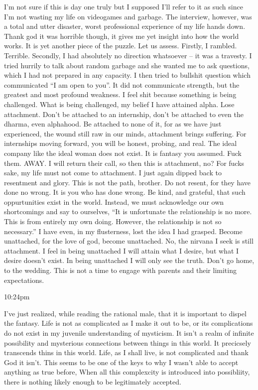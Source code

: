 I'm not sure if this is day one truly but I supposed I'll refer to it as
such since I'm not wasting my life on videogames and garbage. The
interview, however, was a total and utter disaster, worst professional
experience of my life hands down. Thank god it was horrible though, it
gives me yet insight into how the world works. It is yet another piece
of the puzzle. Let us assess. Firstly, I rambled. Terrible. Secondly, I
had absolutely no direction whatsoever -- it was a travesty. I tried
hurrily to talk about random garbage and she wanted me to ask questions,
which I had not prepared in any capacity. I then tried to bullshit
question which communicated ``I am open to you''. It did not communicate
strength, but the greatest and most profound weakness. I feel shit
because something is being challenged. What is being challenged, my
belief I have attained alpha. Lose attachment. Don't be attached to an
internship, don't be attached to even the dharma, even alphahood. Be
attached to none of it, for as we have just experienced, the wound still
raw in our minds, attachment brings suffering. For internships moving
forward, you will be honest, probing, and real. The ideal company like
the ideal woman does not exist. It is fantasy you assumed. Fuck them.
AWAY. I will return their call, so then this is attachment, no? For
fucks sake, my life must not come to attachment. I just again dipped
back to resentment and glory. This is not the path, brother. Do not
resent, for they have done no wrong. It is you who has done wrong. Be
kind, and grateful, that such oppurtunities exist in the world. Instead,
we must acknowledge our own shortcomings and say to ourselves, ``It is
unfortunate the relationship is no more. This is from entirely my own
doing. However, the relationship is not so necessary.'' I have even, in
my flusterness, lost the idea I had grasped. Become unattached, for the
love of god, become unattached. No, the nirvana I seek is still
attachment. I feel in being unattached I will attain what I desire, but
what I desire doesn't exist. In being unattached I will only see the
truth. Don't go home, to the wedding. This is not a time to engage with
parents and their limiting expectations.

10:24pm

I've just realized, while reading the rational male, that it is
important to dispel the fantasy. Life is not as complicated as I make it
out to be, or its complications do not exist in my juvenile
understanding of mysticism. It isn't a realm of infinite possibility and
mysterious connections between things in this world. It precicsely
transcends thins in this world. Life, as I shall live, is not
complicated and thank God it isn't. This seems to be one of the keys to
why I wasn't able to accept anything as true before, When all this
complexcity is introduced into possibliity, there is nothing likely
enough to be legitimately accepted.

